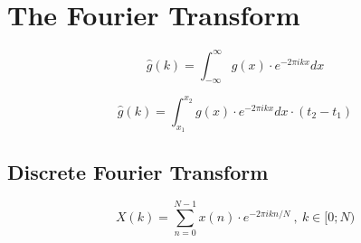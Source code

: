 \section{The Fourier Transform}

\begin{equation}
     \hat g(k) = \int_{-\infty}^{\infty} g(x) \cdot e^{-2 \pi i k x} dx
\end{equation}

\begin{equation}
     \hat g(k) = \int_{x_1}^{x_2} g(x) \cdot e^{-2 \pi i k x} dx \cdot (t_2 - t_1)
\end{equation}

\subsection{Discrete Fourier Transform}

\begin{equation}
    X(k) = \sum_{n = 0}^{N - 1} x(n) \cdot e^{-2 \pi i kn / N} ~,~ k \in [0; N)
\end{equation}
